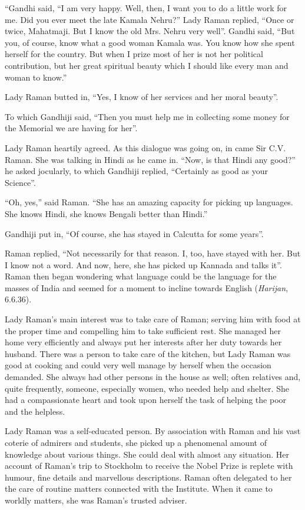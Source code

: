 ``Gandhi said, ``I am very happy. Well, then, I want you to do a little work for me. Did you ever meet the late Kamala Nehru?'' Lady Raman replied, ``Once or twice, Mahatmaji. But I know the old Mrs. Nehru very well''. Gandhi said, ``But you, of course, know what a good woman Kamala was. You know how she spent herself for the country. But when I prize most of her is not her political contribution, but her great spiritual beauty which I should like every man and woman to know.''

Lady Raman butted in, ``Yes, I know of her services and her moral beauty''.

To which Gandhiji said, ``Then you must help me in collecting some money for the Memorial we are having for her''.

Lady Raman heartily agreed. As this dialogue was going on, in came Sir C.V. Raman. She was talking in Hindi as he came in. ``Now, is that Hindi any good?'' he asked jocularly, to which Gandhiji replied, ``Certainly as good as your Science''. 

``Oh, yes,'' said Raman. ``She has an amazing capacity for picking up languages. She knows Hindi, she knows Bengali better than Hindi.''

Gandhiji put in, ``Of course, she has stayed in Calcutta for some years''.

\eject

Raman replied, ``Not necessarily for that reason. I, too, have stayed with her. But I know not a word. And now, here, she has picked up Kannada and talks it''. Raman then began wondering what language could be the language for the masses of India and seemed for a moment to incline towards English ({\em Harijan}, 6.6.36).

Lady Raman's main interest was to take care of Raman; serving him with food at the proper time and compelling him to take sufficient rest. She managed her home very efficiently and always put her interests after her duty towards her husband. There was a person to take care of the kitchen, but Lady Raman was good at cooking and could very well manage by herself when the occasion demanded. She always had other persons in the house as well; often relatives and, quite frequently, someone, especially women, who needed help and shelter. She had a compassionate heart and took upon herself the task of helping the poor and the helpless.

Lady Raman was a self-educated person. By association with Raman and his vast coterie of admirers and students, she picked up a phenomenal amount of knowledge about various things. She could deal with almost any situation. Her account of Raman's trip to Stockholm to receive the Nobel Prize is replete with humour, fine details and marvellous descriptions. Raman often delegated to her the care of routine matters connected with the Institute. When it came to worldly matters, she was Raman's trusted adviser.

